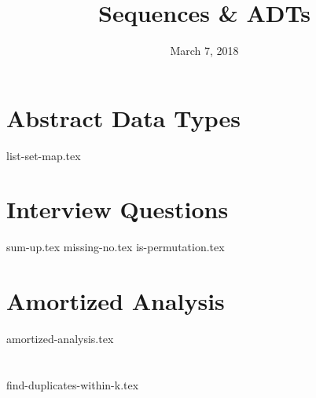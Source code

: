 \documentclass[11pt]{exam}
\title{Sequences \& ADTs}
\date{March 7, 2018}
\begin{document}
\maketitle

\section{Abstract Data Types}
{list-set-map.tex}

\clearpage

\section{Interview Questions}
\begin{questions}
{sum-up.tex}
{missing-no.tex}
{is-permutation.tex}
\end{questions}

\clearpage

\section{Amortized Analysis}
\begin{questions}
{amortized-analysis.tex}
\end{questions}

\section{}
\begin{questions}
{find-duplicates-within-k.tex}
\end{questions}
\end{document}
